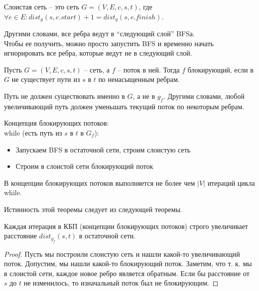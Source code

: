 \begin{definition}
    Слоистая сеть -- это сеть $G = (V, E, c, s, t)$, где $\forall e \in E: dist_g(s, e.start) + 1 = dist_g(s, e.finish)$.
\end{definition}

\noindent Другими словами, все ребра ведут в ``следующий слой'' BFSа. \\
Чтобы ее получить, можно просто запустить BFS и временно начать игнорировать все ребра, которые ведут не в следующий слой.

\begin{definition}
    Пусть $G = (V, E, c, s, t)$ -- сеть, а $f$ -- поток в ней. Тогда $f$ блокирующий, если в $G$ не существует пути из $s$ в $t$ по ненасыщенным ребрам.
\end{definition}

\begin{note}
    Путь не должен существовать именно в $G$, а не в $g_f$. Другими словами, любой увеличивающий путь должен уменьшать текущий поток по некоторым ребрам.
\end{note}

\begin{definition}
    Концепция блокирующих потоков: \\
    while (есть путь из $s$ в $t$ в $G_f$):
        \begin{itemize}
            \item Запускаем BFS в остаточной сети, строим слоистую сеть
            \item Строим в слоистой сети блокирующий поток
        \end{itemize}
\end{definition}

\begin{theorem}
    В концепции блокирующих потоков выполняется не более чем $|V|$ итераций цикла while.
\end{theorem}

\noindent Истинность этой теоремы следует из следующей теоремы.

\begin{theorem}
    Каждая итерация в КБП (концепции блокирующих потоков) строго увеличивает расстояние $dist_{g_f} (s, t)$ в остаточной сети.
\end{theorem}

\begin{proof}
    Пусть мы построили слоистую сеть и нашли какой-то увеличивающий поток. Допустим, мы нашли какой-то блокирующий поток. Заметим, что т. к. мы в слоистой сети, каждое новое ребро является обратным. Если бы расстояние от $s$ до $t$ не изменилось, то изначальный поток был не блокирующим.
\end{proof}

